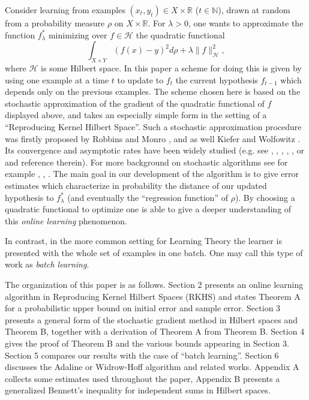 \documentclass[twoside]{amsart}
\theoremstyle{theorem}
\theoremstyle{definition}
\theoremstyle{remark}
\def\H{{\mathscr H}}
\def\N{{\mathbb N}}
\def\R{{\mathbb R}}        %
\begin{document}
Consider learning from examples $(x_t, y_t)\in X\times \R$ ($t\in \N$), drawn at random
from a probability measure $\rho$ on
$X\times \R$. For $\lambda>0$, one wants to approximate the function $f^\ast_\lambda$ minimizing over $f\in \H$ the
quadratic functional
\[ \int_{X\times Y} (f(x)-y)^2 d \rho + \lambda \| f \|^2_\H, \]
where $\H$ is some Hilbert space. In this paper a scheme for doing
this is given by using one example at a time $t$ to update to
$f_{t}$ the current hypothesis $f_{t-1}$ which depends only on the
previous examples. The scheme chosen here is based on the
stochastic approximation of the gradient of the quadratic
functional of $f$ displayed above, and takes an especially simple
form in the setting of a ``Reproducing Kernel Hilbert Space''.
Such a stochastic approximation procedure was firstly proposed by
Robbins and Monro \cite{RobMon51}, and as well Kiefer and Wolfowitz
\cite{KieWol52}. Its convergence and asymptotic rates have
been widely studied (e.g. see \cite{RobSie71}, \cite{Duflo97},
\cite{Benaim99}, \cite{Gyofi80}, \cite{Tadic04}, or
\cite{GyoKohKrzWal02} and reference therein). For more background
on stochastic algorithms see for example \cite{BerTsi96},
\cite{Duflo96}, \cite{KusYin03}. The main goal in our development
of the algorithm is to give error estimates which characterize in
probability the distance of our updated hypothesis to
$f^\ast_\lambda$ (and eventually the ``regression function'' of
$\rho$). By choosing a quadratic functional to optimize one is
able to give a deeper understanding of this \emph{online learning}
phenomenon.

In contrast, in the more common setting for Learning Theory the
learner is presented with the whole set of examples in one batch.
One may call this type of work as \emph{batch learning}.

The organization of this paper is as follows. Section 2 presents
an online learning algorithm in Reproducing Kernel Hilbert Spaces
(RKHS) and states Theorem A for a probabilistic upper bound on
initial error and sample error. Section 3 presents a general form
of the stochastic gradient method in Hilbert spaces and Theorem B,
together with a derivation of Theorem A from Theorem B. Section 4
gives the proof of Theorem B and the various bounds appearing in
Section 3. Section 5 compares our results with the case of ``batch
learning''. Section 6 discusses the Adaline or Widrow-Hoff algorithm and related
works. Appendix A collects some estimates used
throughout the paper, Appendix B presents a generalized Bennett's
inequality for independent sums in Hilbert spaces.
\end{document}
